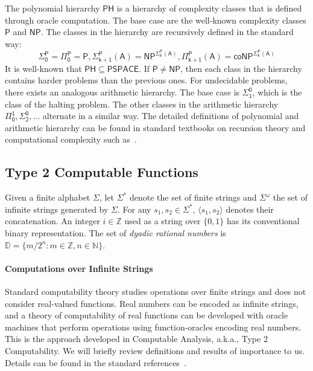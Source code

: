 \documentclass[10pt]{article}
\theoremstyle{plain}
\theoremstyle{definition}
\newcommand{\np}{\mathsf{NP}}
\begin{document}
The polynomial hierarchy $\mathsf{PH}$ is a hierarchy of complexity classes that is defined through oracle computation. The base case are the well-known complexity classes $\mathsf{P}$ and $\np$. The classes in the hierarchy are recursively defined in the standard way:  
$$
\mathsf{\Sigma_0^P} = \mathsf{\Pi_0^P} = \mathsf{P}, \mathsf{\Sigma_{k+1}^P(A)} =\mathsf{NP^{\Sigma_k^P(A)}}, \mathsf{\Pi_{k+1}^P(A)}= \mathsf{coNP^{\Sigma_{k}^P(A)}}
$$
It is well-known that $\mathsf{PH}\subseteq \mathsf{PSPACE}$. If $\mathsf{P}\neq \mathsf{NP}$, then each class in the hierarchy contains harder problems than the previous ones. For undecidable problems, there exists an analogous arithmetic hierarchy. The base case is $\mathsf{\Sigma_1^0}$, which is the class of the halting problem. The other classes in the arithmetic hierarchy $\mathsf{\Pi_0^1}, \mathsf{\Sigma_2^0}, ...$ alternate in a similar way. The detailed definitions of polynomial and arithmetic hierarchy can be found in standard textbooks on recursion theory and computational complexity such as~\cite{arora09}. 

\subsection{Type 2 Computable Functions}

Given a finite alphabet $\Sigma$, let $\Sigma^*$ denote the set of finite strings and $\Sigma^{\omega}$ the set of infinite strings generated by $\Sigma$. For any $s_1, s_2\in \Sigma^*$, $\langle s_1,s_2\rangle$ denotes their concatenation. An integer $i\in \mathbb{Z}$ used as a string over $\{0,1\}$ has its conventional binary representation. The set of {\em dyadic rational numbers} is $\mathbb{D} = \{m/2^n: m\in \mathbb{Z}, n\in \mathbb{N}\}$. 

\paragraph{Computations over Infinite Strings} Standard computability theory studies operations over finite strings and does not consider real-valued functions. Real numbers can be encoded as infinite strings, and a theory of computability of real functions can be developed with oracle machines that perform operations using function-oracles encoding real numbers. This is the approach developed in Computable Analysis, a.k.a., Type 2 Computability. We will briefly review definitions and results of importance to us. Details can be found in the standard references~\cite{CAbook,Kobook,vasco}.
\end{document}
